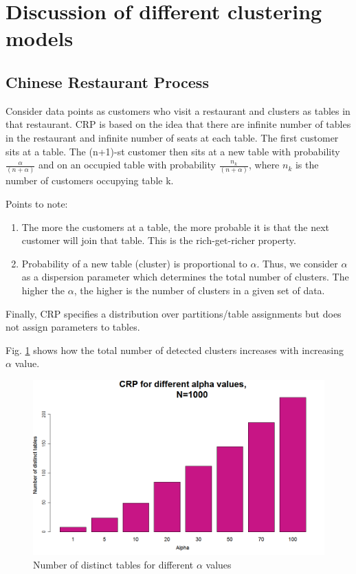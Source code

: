 \documentclass{article} %
\begin{document}
\section{Discussion of different clustering models}
\subsection{Chinese Restaurant Process}
Consider data points as customers who visit a restaurant and clusters as tables in that restaurant. CRP is based on the idea that there are infinite number of tables in the restaurant and infinite number of seats at each table. The first customer sits at a table. The (n+1)-st customer then sits at a new table with probability $\frac{\alpha}{(n+\alpha)}$ and on an occupied table with probability $\frac{n_k}{(n+\alpha)}$, where $n_k$ is the number of customers occupying table k.

Points to note:
\begin{enumerate}
\item The more the customers at a table, the more probable it is that the next customer will join that table. This is the rich-get-richer property.
\item Probability of a new table (cluster) is proportional to $\alpha$. Thus, we consider $\alpha$ as a dispersion parameter which determines the total number of clusters. The higher the $\alpha$, the higher is the number of clusters in a given set of data.
\end{enumerate}
Finally, CRP specifies a distribution over partitions/table assignments but does not assign parameters to tables.

Fig. \ref{fig:crp} shows how the total number of detected clusters increases with increasing $\alpha$ value.
\begin{figure}[h]
\begin{center}
\includegraphics[width=.5\linewidth]{crp.png}
\caption{Number of distinct tables for different $\alpha$ values}
\label{fig:crp}
\end{center}
\end{figure}
\end{document}
